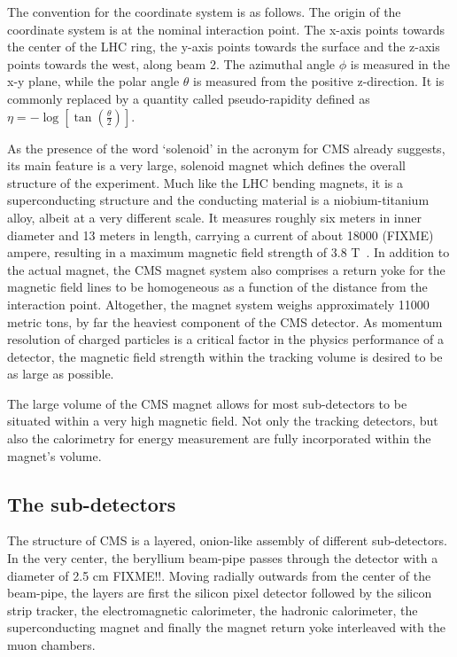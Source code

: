 The convention for the coordinate system is as follows. The origin of the coordinate system is at the nominal
interaction point. The x-axis points towards the center of the LHC ring, the y-axis points towards the surface
and the z-axis points towards the west, along beam 2. The azimuthal angle $\phi$ is measured in the x-y plane, while the
polar angle $\theta$ is measured from the positive z-direction. It is commonly replaced by a quantity called 
pseudo-rapidity defined as $\eta = - \log \left[ \tan \left(\frac{\theta}{2} \right) \right]$.



As the presence of the word `solenoid' in the acronym for CMS already suggests, its main feature is a very large, solenoid
magnet which defines the overall structure of the experiment. Much like the LHC bending magnets, it is a superconducting
structure and the conducting material is a niobium-titanium alloy, albeit at a very different scale. It measures roughly six
meters in inner diameter and 13 meters in length, carrying a current of about \num{18000} (FIXME) ampere, resulting in a
maximum magnetic field strength of 3.8 T~\cite{magnettdr}. In addition to the actual magnet, the CMS magnet system
also comprises a return yoke for the magnetic field lines to be homogeneous as a function of the distance from the interaction
point. Altogether, the magnet system weighs approximately \num{11000} metric tons, by far the heaviest component of the 
CMS detector. As momentum resolution of charged particles is a critical factor in the physics performance of a detector, the magnetic
field strength within the tracking volume is desired to be as large as possible. 

The large volume of the CMS magnet allows for most sub-detectors to be situated within a very high magnetic field. Not only the
tracking detectors, but also the calorimetry for energy measurement are fully incorporated within the magnet's volume.



\subsection{The sub-detectors}
\label{sub:cms_subdet}
The structure of CMS is a layered, onion-like assembly of different sub-detectors. In the very center, the beryllium beam-pipe
passes through the detector with a diameter of 2.5 cm FIXME!!. Moving radially outwards from the center of the beam-pipe,
the layers are first the silicon pixel detector followed by the silicon strip tracker, the electromagnetic calorimeter,
the hadronic calorimeter, the superconducting magnet and finally the magnet return yoke interleaved with the muon chambers.

